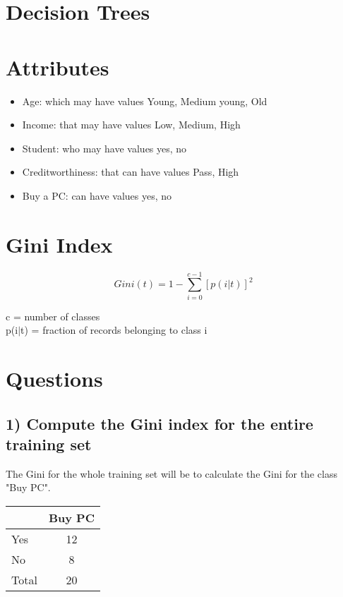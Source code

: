 \section{Decision Trees}

\section*{Attributes}
	\begin{itemize}
		\item Age: which may have values {Young, Medium young, Old}
		\item Income: that may have values {Low, Medium, High}
		\item Student: who may have values {yes, no}
		\item Creditworthiness: that can have values {Pass, High}
		\item Buy a PC: can have values {yes, no}
	\end{itemize}

\section*{Gini Index}

	
		\begin{equation}
		Gini(t) = 1 - \sum_{i=0}^{c-1} [p(i|t)]^{2} 
		\end{equation}
	
		c = number of classes \\
		p(i$|$t) = fraction of records belonging to class i


\section*{Questions} 
	
		\subsection*{1) Compute the Gini index for the entire training set}

		The Gini for the whole training set will be to calculate the Gini for the 
		class "Buy PC".

		\begin{table}[H]
			\begin{tabular}{ l | c }
				 & Buy PC \\ \hline
				Yes & 12 \\ \hline
				No & 8 \\ \hline
				Total & 20 \\
			\end{tabular}
		\end{table}

